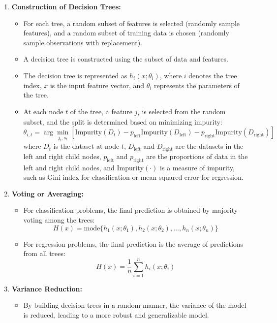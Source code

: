 \documentclass{article}
\begin{document}
\begin{enumerate}
    \item \textbf{Construction of Decision Trees:}
        \begin{itemize}
            \item For each tree, a random subset of features is selected (randomly sample features), and a random subset of training data is chosen (randomly sample observations with replacement).
            \item A decision tree is constructed using the subset of data and features.
            \item The decision tree is represented as \(h_i(x;\theta_i)\), where \(i\) denotes the tree index, \(x\) is the input feature vector, and \(\theta_i\) represents the parameters of the tree.
            \item At each node \(t\) of the tree, a feature \(j_t\) is selected from the random subset, and the split is determined based on minimizing impurity:
            \[
            \theta_{i,t} = \arg\min_{j_t, s_t} \left[\textrm{Impurity}(D_t) - p_{\textrm{left}}\textrm{Impurity}(D_{\textrm{left}}) - p_{\textrm{right}}\textrm{Impurity}(D_{\textrm{right}})\right]
            \]
            where \(D_t\) is the dataset at node \(t\), \(D_{\textrm{left}}\) and \(D_{\textrm{right}}\) are the datasets in the left and right child nodes, \(p_{\textrm{left}}\) and \(p_{\textrm{right}}\) are the proportions of data in the left and right child nodes, and \(\textrm{Impurity}(\cdot)\) is a measure of impurity, such as Gini index for classification or mean squared error for regression.
        \end{itemize}
    
    \item \textbf{Voting or Averaging:}
        \begin{itemize}
            \item For classification problems, the final prediction is obtained by majority voting among the trees:
            \[
            H(x) = \textrm{mode}\{h_1(x;\theta_1), h_2(x;\theta_2), \ldots, h_n(x;\theta_n)\}
            \]
            \item For regression problems, the final prediction is the average of predictions from all trees:
            \[
            H(x) = \frac{1}{n}\sum_{i=1}^{n}h_i(x;\theta_i)
            \]
        \end{itemize}
    
    \item \textbf{Variance Reduction:}
        \begin{itemize}
            \item By building decision trees in a random manner, the variance of the model is reduced, leading to a more robust and generalizable model.
        \end{itemize}
\end{enumerate}
\end{document}
